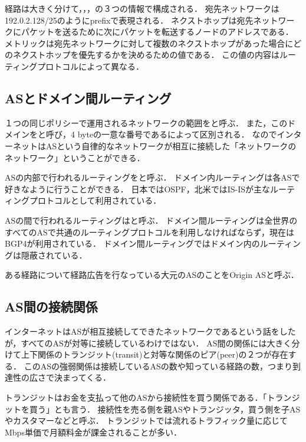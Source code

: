 経路は大きく分けて，，，の３つの情報で構成される．
宛先ネットワークは192.0.2.128/25のようにprefixで表現される．
ネクストホップは宛先ネットワークにパケットを送るために次にパケットを転送するノードのアドレスである．
メトリックは宛先ネットワークに対して複数のネクストホップがあった場合にどのネクストホップを優先するかを決めるための値である．
この値の内容はルーティングプロトコルによって異なる．

\subsection{ASとドメイン間ルーティング}

１つの同じポリシーで運用されるネットワークの範囲をと呼ぶ．
また，このドメインをと呼び，4 byteの一意な番号であるによって区別される．
なのでインターネットはASという自律的なネットワークが相互に接続した「ネットワークのネットワーク」ということができる．

ASの内部で行われるルーティングをと呼ぶ．
ドメイン内ルーティングは各ASで好きなように行うことができる．
日本ではOSPF，北米ではIS-ISが主なルーティングプロトコルとして利用されている．

ASの間で行われるルーティングはと呼ぶ．
ドメイン間ルーティングは全世界のすべてのASで共通のルーティングプロトコルを利用しなければならず，現在はBGP4が利用されている．
ドメイン間ルーティングではドメイン内のルーティングは隠蔽されている．

ある経路について経路広告を行なっている大元のASのことをOrigin ASと呼ぶ．

\subsection{AS間の接続関係}

インターネットはASが相互接続してできたネットワークであるという話をしたが，すべてのASが対等に接続しているわけではない．
AS間の関係には大きく分けて上下関係のトランジット(transit)と対等な関係のピア(peer)の２つが存在する．
このASの強弱関係は接続しているASの数や知っている経路の数，つまり到達性の広さで決まってくる．

トランジットはお金を支払って他のASから接続性を買う関係である．「トランジットを買う」とも言う．
接続性を売る側を親ASやトランジッタ，買う側を子ASやカスタマーなどと呼ぶ．
トランジットでは流れるトラフィック量に応じてMbps単価で月額料金が課金されることが多い．

